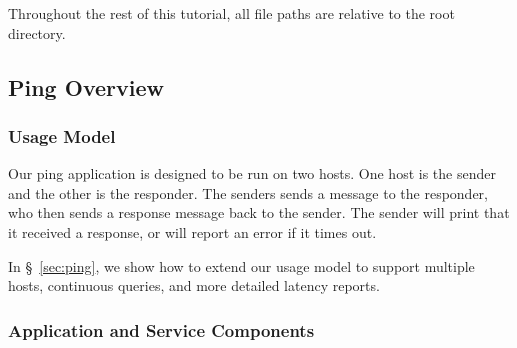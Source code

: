 Throughout the rest of this tutorial, all file paths are relative to
the  root directory.

\subsection{Ping Overview}
\label{sec:pingoverview}

\subsubsection{Usage Model}

Our ping application is designed to be run on two hosts.  One host is
the sender and the other is the responder.  The senders sends a
message to the responder, who then sends a response message back to
the sender.  The sender will print that it received a response, or
will report an error if it times out.

In \S~\ref{sec:ping}, we show how to extend our usage model to support
multiple hosts, continuous queries, and more detailed latency reports.

\subsubsection{Application and Service Components}



